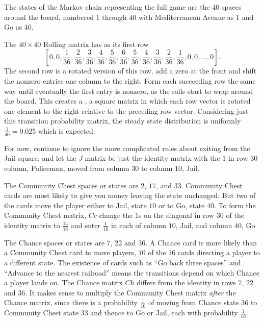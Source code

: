 \documentclass[12pt]{article}
\begin{document}
The states of the Markov chain representing the full game are the \( 40 \)
spaces around the board, numbered \( 1 \) through \( 40 \) with
Mediterranean Avenue as \( 1 \) and Go as \( 40 \).

The \( 40 \times 40 \) Rolling matrix has as its first row
\[
    [0, 0, \frac{1}{36}, \frac{2}{36},\frac{3}{36},\frac{4}{36},\frac{5}
    {36},\frac{6}{36}, \frac{5}{36},\frac{4}{36},\frac{3}{36},\frac{2}{36},\frac
    {1}{36}, 0, 0, \dots, 0].
\] The second row is a rotated version of this row, add a zero at the
front and shift the nonzero entries one column to the right.  Form each
succeeding row the same way until eventually the first entry is nonzero,
as the rolls start to wrap around the board.  This creates a %
%
, a square matrix in which each row vector is rotated one element to the
right relative to the preceding row vector.  Considering just this
transition probability matrix, the steady state distribution is
uniformly \( \frac{1}{40} = 0.025 \) which is expected.

For now, continue to ignore the more complicated rules about exiting
from the Jail square, and let the \( J \) matrix be just the identity
matrix with the \( 1 \) in row \( 30 \) column, Policeman, moved from
column \( 30 \) to column \( 10 \), Jail.

The Community Chest spaces or states are \( 2 \), \( 17 \), and \( 33 \).
Community Chest cards are most likely to give you money leaving the
state unchanged.  But two of the cards move the player either to Jail,
state \( 10 \) or to Go, state \( 40 \).  To form the Community Chest
matrix, \( \mathit{Cc} \) change the \( 1 \)s on the diagonal in row \(
30 \) of the identity matrix to \( \frac{14}{16} \) and enter \( \frac{1}
{16} \) in each of column \( 10 \), Jail, and column \( 40 \), Go.

The Chance spaces or states are \( 7 \), \( 22 \) and \( 36 \).  A
Chance card is more likely than a Community Chest card to move players, \(
10 \) of the \( 16 \) cards directing a player to a different state.
The existence of cards such as ``Go back three spaces'' and ``Advance to
the nearest railroad'' means the transitions depend on which Chance a
player lands on.  The Chance matrix \( \mathit{Ch} \) differs from the
identity in rows \( 7 \), \( 22 \) and \( 36 \).  It makes sense to
multiply the Community Chest matrix \emph{after} the Chance matrix,
since there is a probability \( \frac{1}{16} \) of moving from Chance
state \( 36 \) to Community Chest state \( 33 \) and thence to Go or
Jail, each with probability \( \frac{1}{16} \).
\end{document}
